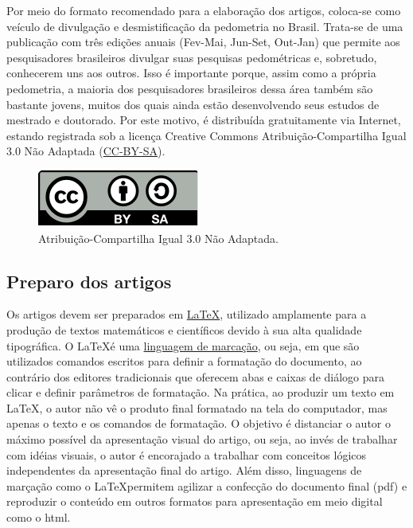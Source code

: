 Por meio do formato recomendado para a elaboração dos artigos, \pedometria coloca-se como veículo de divulgação e desmistificação da pedometria no Brasil. Trata-se de uma publicação com três edições anuais (Fev-Mai, Jun-Set, Out-Jan) que permite aos pesquisadores brasileiros divulgar suas pesquisas pedométricas e, sobretudo, conhecerem uns aos outros. Isso é importante porque, assim como a própria pedometria, a maioria dos pesquisadores brasileiros dessa área também são bastante jovens, muitos dos quais ainda estão desenvolvendo seus estudos de mestrado e doutorado. Por este motivo, \pedometria é distribuída gratuitamente via Internet, estando registrada sob a licença Creative Commons Atribuição-Compartilha Igual 3.0 Não Adaptada (\href{http://creativecommons.org/licenses/by-sa/2.0/}{CC-BY-SA}).

\begin{figure}[h!]
\centering
\includegraphics[scale=0.8]{figuras/cc-by-sa}
\caption{Atribuição-Compartilha Igual 3.0 Não Adaptada.}
\end{figure}

\subsection{Preparo dos artigos}

Os artigos devem ser preparados em \href{http://pt.wikipedia.org/wiki/Latex}{\LaTeX}, utilizado amplamente para a produção de textos matemáticos e científicos devido à sua alta qualidade tipográfica. O \LaTeX é uma \href{http://pt.wikipedia.org/wiki/Linguagem\_de\_marca\%C3\%A7\%C3\%A3o}{linguagem de marcação}, ou seja, em que são utilizados comandos escritos para definir a formatação do documento, ao contrário dos editores tradicionais que oferecem abas e caixas de diálogo para clicar e definir parâmetros de formatação. Na prática, ao produzir um texto em \LaTeX, o autor não vê o produto final formatado na tela do computador, mas apenas o texto e os comandos de formatação. O objetivo é distanciar o autor o máximo possível da apresentação visual do artigo, ou seja, ao invés de trabalhar com idéias visuais, o autor é encorajado a trabalhar com conceitos lógicos independentes da apresentação final do artigo. Além disso, linguagens de marçação como o \LaTeX permitem agilizar a confecção do documento final (pdf) e reproduzir o conteúdo em outros formatos para apresentação em meio digital como o html.

